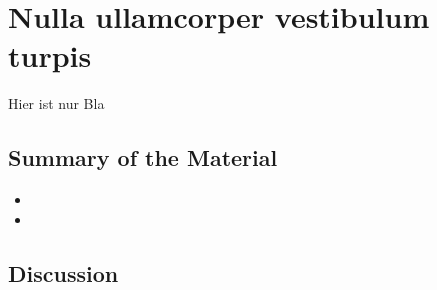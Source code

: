 \section{Nulla ullamcorper vestibulum turpis}
Hier ist nur Bla
\label{sec:nulla}

\subsection{Summary of the Material}
\lipsum[2]

\begin{itemize}
	\item \lipsum[1]
	\item \lipsum[2]
\end{itemize}

\lipsum[3]

\subsection{Discussion}
\lipsum[4-6]
